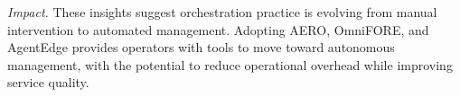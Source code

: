 \vspace{0.5em}
\noindent\textit{Impact.} These insights suggest orchestration practice is evolving from manual intervention to automated management. Adopting \ac{AERO}, \ac{OmniFORE}, and \ac{AgentEdge} provides operators with tools to move toward autonomous management, with the potential to reduce operational overhead while improving service quality.
